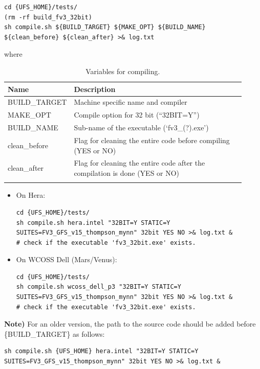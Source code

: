 \documentclass[11pt,fleqn]{report}              %
\begin{document}
\lstset{language=bash}   
\begin{lstlisting}[frame=trBL]
cd {UFS_HOME}/tests/
(rm -rf build_fv3_32bit)
sh compile.sh ${BUILD_TARGET} ${MAKE_OPT} ${BUILD_NAME} ${clean_before} ${clean_after} >& log.txt
\end{lstlisting}
where
{
\fontsize{10}{12}\selectfont
\begin{longtable}{p{0.17\linewidth} | p{0.75\linewidth} }
\hline
\hline
 Name & Description \\
\hline
 BUILD\_TARGET & Machine specific name and compiler \\
 MAKE\_OPT & Compile option for 32 bit (``32BIT=Y'') \\
 BUILD\_NAME & Sub-name of the executable (`fv3\_(?).exe') \\
 clean\_before & Flag for cleaning the entire code before compiling (YES or NO) \\
 clean\_after & Flag for cleaning the entire code after the compilation is done (YES or NO) \\
\hline
\caption{Variables for compiling.}
\label{table:fv3_var_compile}
\end{longtable}
}

\begin{itemize}
\item On Hera:
\lstset{language=bash}   
\begin{lstlisting}[frame=trBL]
cd {UFS_HOME}/tests/
sh compile.sh hera.intel "32BIT=Y STATIC=Y SUITES=FV3_GFS_v15_thompson_mynn" 32bit YES NO >& log.txt &
# check if the executable 'fv3_32bit.exe' exists.
\end{lstlisting} 

\item On WCOSS Dell (Mars/Venus):
\lstset{language=bash}   
\begin{lstlisting}[frame=trBL]
cd {UFS_HOME}/tests/
sh compile.sh wcoss_dell_p3 "32BIT=Y STATIC=Y SUITES=FV3_GFS_v15_thompson_mynn" 32bit YES NO >& log.txt &
# check if the executable 'fv3_32bit.exe' exists.
\end{lstlisting} 


\end{itemize}

{\bf Note)} For an older version, the path to the source code should be added before \{BUILD\_TARGET\} as follows:
\lstset{language=bash}   
\begin{lstlisting}[frame=trBL]
sh compile.sh {UFS_HOME} hera.intel "32BIT=Y STATIC=Y SUITES=FV3_GFS_v15_thompson_mynn" 32bit YES NO >& log.txt &
\end{lstlisting} 
\end{document}
